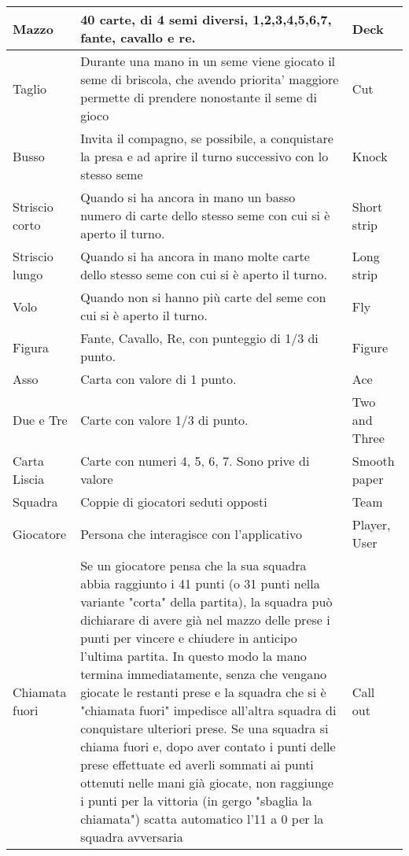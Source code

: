 \begin{table}[!ht]
\begin{adjustbox}{max width=1.1\textwidth,center}
\begin{tabular}{|l|p{10cm}|l|}
        Mazzo & 40 carte, di 4 semi diversi, 1,2,3,4,5,6,7, fante, cavallo e re. & Deck \\ \hline
        Taglio & Durante una mano in un seme viene giocato il seme di briscola, che avendo priorita’ maggiore
        permette di prendere nonostante il seme di gioco & Cut \\ \hline
        Busso & Invita il compagno, se possibile, a conquistare la presa e ad aprire il turno successivo con lo stesso seme & Knock \\ \hline
        Striscio corto & Quando si ha ancora in mano un basso numero di carte dello stesso seme con cui si è aperto il turno. & Short strip \\ \hline
        Striscio lungo & Quando si ha ancora in mano molte carte dello stesso seme con cui si è aperto il turno. & Long strip \\ \hline
        Volo & Quando non si hanno più carte del seme con cui si è aperto il turno. & Fly \\ \hline
        Figura & Fante, Cavallo, Re, con punteggio di 1/3 di punto. & Figure \\ \hline
        Asso & Carta con valore di 1 punto. & Ace \\ \hline
        Due e Tre & Carte con valore 1/3 di punto. & Two and Three \\ \hline
        Carta Liscia & Carte con numeri 4, 5, 6, 7. Sono prive di valore & Smooth paper \\ \hline
        Squadra & Coppie di giocatori seduti opposti & Team \\ \hline
        Giocatore & Persona che interagisce con l’applicativo & Player, User \\ \hline
        Chiamata fuori & Se un giocatore pensa che la sua squadra abbia raggiunto i 41 punti (o 31 punti nella variante "corta" della partita), la squadra può  dichiarare di avere già nel mazzo delle prese i punti per vincere e chiudere in anticipo l'ultima partita. In questo modo la mano termina immediatamente, senza che vengano giocate le restanti prese e la squadra che si è "chiamata fuori" impedisce all'altra squadra di conquistare ulteriori prese. Se una squadra si chiama fuori e, dopo aver contato i punti delle prese effettuate ed averli sommati ai punti ottenuti nelle mani già giocate, non raggiunge i punti per la vittoria (in gergo "sbaglia la chiamata") scatta automatico l'11 a 0 per la squadra avversaria & Call out \\ \hline
    \end{tabular}
    \end{adjustbox}
\end{table}
\newpage

